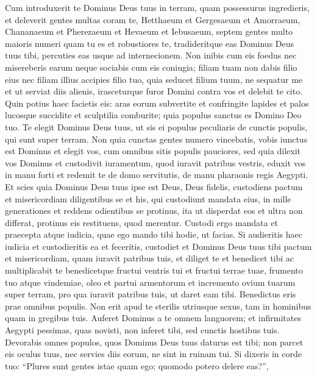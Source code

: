 \begin{biblechapter}
\begin{biblechapter}
\begin{biblechapter}
\begin{biblechapter}
\begin{biblechapter}
\begin{biblechapter}
\begin{biblechapter}
\verse Cum introduxerit te Dominus Deus tuus in terram, quam possessurus ingredieris, et deleverit gentes multas coram te, Hetthaeum et Gergesaeum et Amorraeum, Chananaeum et Pherezaeum et Hevaeum et Iebusaeum, septem gentes multo maioris numeri quam tu es et robustiores te, 
\verse tradideritque eas Dominus Deus tuus tibi, percuties eas usque ad internecionem. Non inibis cum eis foedus nec misereberis earum 
 \verse neque sociabis cum eis coniugia; filiam tuam non dabis filio eius nec filiam illius accipies filio tuo, 
\verse quia seducet filium tuum, ne sequatur me et ut serviat diis alienis, irasceturque furor Domini contra vos et delebit te cito. 
 \verse Quin potius haec facietis eis: aras eorum subvertite et confringite lapides et palos lucosque succidite et sculptilia comburite; 
\verse quia populus sanctus es Domino Deo tuo. Te elegit Dominus Deus tuus, ut sis ei populus peculiaris de cunctis populis, qui sunt super terram. 
\verse Non quia cunctas gentes numero vincebatis, vobis iunctus est Dominus et elegit vos, cum omnibus sitis populis pauciores, 
\verse sed quia dilexit vos Dominus et custodivit iuramentum, quod iuravit patribus vestris, eduxit vos in manu forti et redemit te de domo servitutis, de manu pharaonis regis Aegypti. 
\verse Et scies quia Dominus Deus tuus ipse est Deus, Deus fidelis, custodiens pactum et misericordiam diligentibus se et his, qui custodiunt mandata eius, in mille generationes 
 \verse et reddens odientibus se protinus, ita ut disperdat eos et ultra non differat, protinus eis restituens, quod merentur. 
\verse Custodi ergo mandata et praecepta atque iudicia, quae ego mando tibi hodie, ut facias.
 \verse Si audieritis haec iudicia et custodieritis ea et feceritis, custodiet et Dominus Deus tuus tibi pactum et misericordiam, quam iuravit patribus tuis, 
 \verse et diliget te et benedicet tibi ac multiplicabit te benedicetque fructui ventris tui et fructui terrae tuae, frumento tuo atque vindemiae, oleo et partui armentorum et incremento ovium tuarum super terram, pro qua iuravit patribus tuis, ut daret eam tibi. 
\verse Benedictus eris prae omnibus populis. Non erit apud te sterilis utriusque sexus, tam in hominibus quam in gregibus tuis. 
\verse Auferet Dominus a te omnem languorem; et infirmitates Aegypti pessimas, quas novisti, non inferet tibi, sed cunctis hostibus tuis. 
\verse Devorabis omnes populos, quos Dominus Deus tuus daturus est tibi; non parcet eis oculus tuus, nec servies diis eorum, ne sint in ruinam tui.
 \verse Si dixeris in corde tuo: “Plures sunt gentes istae quam ego; quomodo potero delere eas?”, 

\end{biblechapter}
\end{biblechapter}
\end{biblechapter}
\end{biblechapter}
\end{biblechapter}
\end{biblechapter}
\end{biblechapter}
